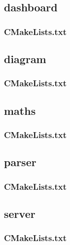 \subsection*{dashboard}

\subsubsection*{CMakeLists.txt}


\subsection*{diagram}

\subsubsection*{CMakeLists.txt}


\subsection*{maths}

\subsubsection*{CMakeLists.txt}


\subsection*{parser}

\subsubsection*{CMakeLists.txt}


\subsection*{server}

\subsubsection*{CMakeLists.txt}



